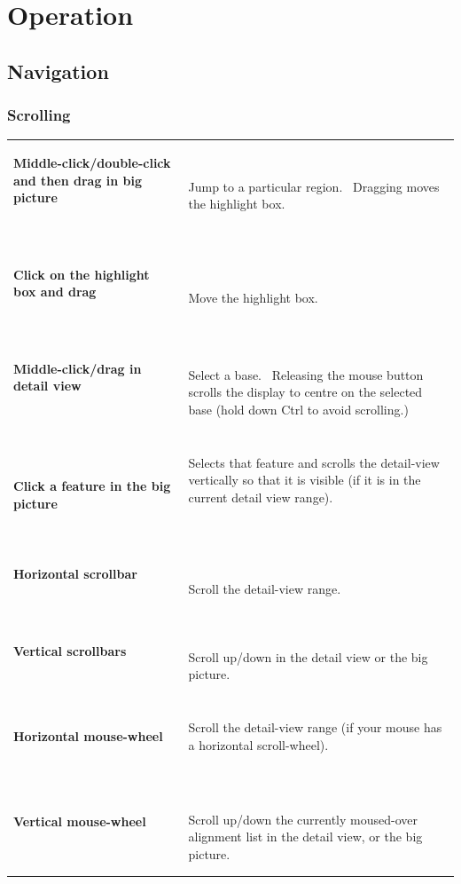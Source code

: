 \documentclass[letterpaper]{article}
\begin{document}
{\color[rgb]{0.0,0.27058825,0.5254902}\section[Operation]{Operation}}
{\color[rgb]{0.30980393,0.5058824,0.7411765}\hypertarget{RefHeading1821056909880}{}\subsection[Navigation]{Navigation}}
{\color[rgb]{0.30980393,0.5058824,0.7411765}\hypertarget{RefHeading1841056909880}{}\subsubsection[Scrolling]{Scrolling}}
\hypertarget{RefHeading1861056909880}{}\begin{flushleft}
\tablehead{}
\begin{supertabular}{p{4.15cm}p{10.436cm}}
{\bfseries Middle-click/double-click and then
drag in big picture}

~
 &
 Jump to a particular region. \ Dragging moves
the highlight box.\\
{\bfseries Click on the highlight box and drag}

~
 &
 Move the highlight box.\\
{\bfseries Middle-click/drag in detail view}

~
 &
 Select a base. \ Releasing the mouse button
scrolls the display to centre on the selected base (hold down Ctrl to
avoid scrolling.)\\
\bfseries Click a feature in the big picture &
{ Selects that feature and scrolls the
detail-view vertically so that it is visible (if it is in the current
detail view range).}

~
\\
{\bfseries Horizontal scrollbar}

~
 &
 Scroll the detail-view range.\\
{\bfseries Vertical scrollbars}

~
 &
 Scroll up/down in the detail view or the big
picture.\\
{\bfseries Horizontal mouse-wheel}

~
 &
{ Scroll the detail-view range (if your mouse
has a horizontal scroll-wheel).}

~
\\
{\bfseries Vertical mouse-wheel}

~
 &
{ Scroll up/down the currently moused-over
alignment list in the detail view, or the big picture.}


\end{supertabular}
\end{flushleft}
\end{document}
